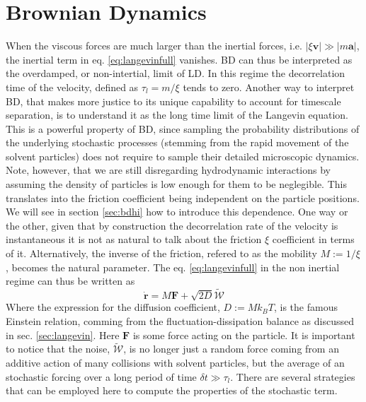 \documentclass[ twoside,openright,titlepage,numbers=noenddot,%
headinclude,footinclude,cleardoublepage=empty,abstract=on,
BCOR=5mm,paper=a4,fontsize=11pt, dvipsnames
]{scrreprt}
\renewcommand{\vec}[1]{\bm{#1}}
\newcommand{\dt}{\delta t}
\newcommand{\noise}{\widetilde{W}}
\begin{document}
\section{Brownian Dynamics}\label{sec:bd}
When the viscous forces are much larger than the inertial forces, i.e. $ |\xi\vec{v}| \gg |m\vec{a}|$, the inertial term in eq. \eqref{eq:langevinfull} vanishes.
\gls{BD} can thus be interpreted as the overdamped, or non-intertial, limit of \gls{LD}. In this regime the decorrelation time of the velocity, defined as $\tau_l = m/\xi$ tends to zero.
Another way to interpret \gls{BD}, that makes more justice to its unique capability to account for timescale separation, is to understand it as the long time limit of the Langevin equation. This is a powerful property of \gls{BD}, since sampling the probability distributions of the underlying stochastic processes (stemming from the rapid movement of the solvent particles) does not require to sample their detailed microscopic dynamics.
Note, however, that we are still disregarding hydrodynamic interactions by assuming the density of particles is low enough for them to be neglegible. This translates into the friction coefficient being independent on the particle positions. We will see in section \ref{sec:bdhi} how to introduce this dependence.
One way or the other, given that by construction the decorrelation rate of the velocity is instantaneous it is not as natural to talk about the friction $\xi$ coefficient in terms of it. Alternatively, the inverse of the friction, refered to as the mobility $M:=1/\xi$, becomes the natural parameter. The eq. \eqref{eq:langevinfull} in the non inertial regime can thus be written as
\begin{equation}
  \label{eq:bdlange}
  \dot{\vec{r}} = M\vec{F} + \sqrt{2D}\vec{\mathcal{\noise}}
\end{equation}
Where the expression for the diffusion coefficient, $D := Mk_BT$, is the famous Einstein relation\cite{einstein}, comming from the fluctuation-dissipation balance as discussed in sec. \ref{sec:langevin}. Here $\vec{F}$ is some force acting on the particle.
It is important to notice that the noise, $\vec{\mathcal{\noise}}$, is no longer just a random force coming from an additive action of many collisions with solvent particles, but the average of an stochastic forcing over a long period of time $\dt \gg \tau_l$.
There are several strategies that can be employed here to compute the properties of the stochastic term.
\end{document}
